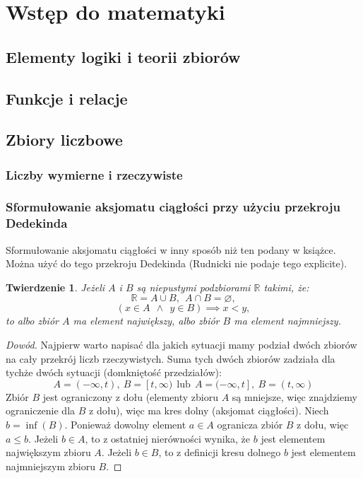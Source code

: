 \documentclass{article}
\newtheorem*{theorem}{Twierdzenie}
\begin{document}
\tableofcontents


\section{Wstęp do matematyki}
\subsection{Elementy logiki i teorii zbiorów}

\subsection{Funkcje i relacje}

\subsection{Zbiory liczbowe}
\subsubsection{Liczby wymierne i rzeczywiste}
\subsubsection{Sformułowanie aksjomatu ciągłości przy użyciu przekroju Dedekinda}
Sformułowanie aksjomatu ciągłości w inny sposób niż ten podany w książce. Można użyć do tego
przekroju Dedekinda (Rudnicki nie podaje tego explicite).

\begin{theorem}
    Jeżeli \(A\) i \(B\) są niepustymi podzbiorami \(\mathbb{R}\) takimi, że:
    \begin{equation}
        \mathbb{R} = A \cup B, \ \ A \cap B = \varnothing,
    \end{equation}
    \begin{equation}
        (x \in A \ \ \land \ \ y \in B) \implies x < y,
    \end{equation}
    to albo zbiór \(A\) ma element największy, albo zbiór \(B\) ma element najmniejszy.
\end{theorem}
\begin{proof}[Dowód]
    Najpierw warto napisać dla jakich sytuacji mamy podział dwóch zbiorów na cały przekrój liczb rzeczywistych.
    Suma tych dwóch zbiorów zadziała dla tychże dwóch sytuacji (domkniętość przedziałów):
    \begin{equation*}
        A=(-\infty, t), \ B=[t,\infty) \ \ \mbox{lub} \ \ A=(-\infty, t], \ B=(t,\infty)
    \end{equation*}
    Zbiór \(B\) jest ograniczony z dołu (elementy zbioru \(A\) są mniejsze, więc znajdziemy ograniczenie dla \(B\) z dołu), 
    więc ma kres dolny (aksjomat ciągłości). Niech \(b = \inf(B)\).
    Ponieważ dowolny element \(a \in A\) ogranicza zbiór \(B\) z dołu, więc \(a \leq b\). Jeżeli \(b \in A\), to z ostatniej
    nierówności wynika, że \(b\) jest elementem największym zbioru \(A\). Jeżeli \(b \in B\), to z definicji kresu dolnego
    \(b\) jest elementem najmniejszym zbioru \(B\). 
\end{proof}
\end{document}

